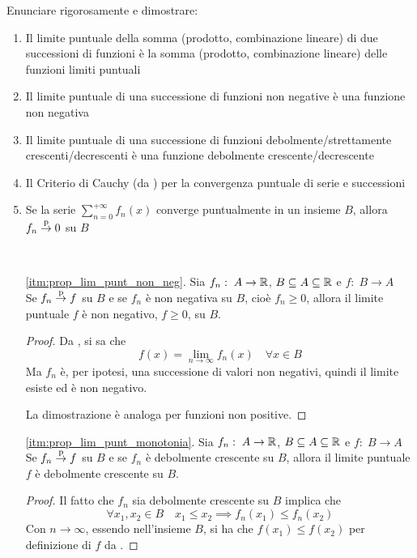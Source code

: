 \begin{exercise}
	\label{ex:dim_prop_lim_conv_punt}
	Enunciare rigorosamente e dimostrare:
	\begin{enumerate}
		\item Il limite puntuale della somma (prodotto, combinazione lineare) di due successioni di funzioni è la somma (prodotto, combinazione lineare) delle funzioni limiti puntuali
		\item \label{itm:prop_lim_punt_non_neg} Il limite puntuale di una successione di funzioni non negative è una funzione non negativa
		\item \label{itm:prop_lim_punt_monotonia} Il limite puntuale di una successione di funzioni debolmente/strettamente crescenti/decrescenti è una funzione debolmente crescente/decrescente
		\item Il Criterio di Cauchy (da ) per la convergenza puntuale di serie e successioni
		\item Se la serie $\sum\limits_{n = 0}^{+\infty} f_n(x)$ converge puntualmente in un insieme $B$, allora $f_n \overset{\text{p}}{\to} 0$ su $B$
	\end{enumerate}
	\begin{solution}~
		\renewcommand\qedsymbol{$\square$} %
		\begin{enumerate}
			\item[\ref{itm:prop_lim_punt_non_neg}.]
				Sia $f_n:\; A \to \mathbb{R}$, $B \subseteq A \subseteq \mathbb{R}$ e $f:\; B \to A$\\
				Se $f_n \overset{\text{p}}{\to} f$ su $B$ e se $f_n$ è non negativa su $B$, cioè $f_n \geq 0$, allora il limite puntuale $f$ è non negativo, $f \geq 0$, su $B$.
				\begin{proof}
					Da , si sa che
					\[f(x) = \lim\limits_{n \to \infty} f_n(x) \quad \forall x \in B\]
					Ma $f_n$ è, per ipotesi, una successione di valori non negativi, quindi il limite esiste ed è non negativo.

					La dimostrazione è analoga per funzioni non positive.
				\end{proof}
			\item[\ref{itm:prop_lim_punt_monotonia}.]
				Sia $f_n:\; A \to \mathbb{R}$, $B \subseteq A \subseteq \mathbb{R}$ e $f:\; B \to A$\\
				Se $f_n \overset{\text{p}}{\to} f$ su $B$ e se $f_n$ è debolmente crescente su $B$, allora il limite puntuale $f$ è debolmente crescente su $B$.
				\begin{proof}
					Il fatto che $f_n$ sia debolmente crescente su $B$ implica che
					\[\forall x_1, x_2 \in B \quad x_1 \leq x_2 \implies f_n(x_1) \leq f_n(x_2)\]
					Con $n \to \infty$, essendo nell'insieme $B$, si ha che $f(x_1) \leq f(x_2)$ per definizione di $f$ da .


\end{proof}
\end{enumerate}
\end{solution}
\end{exercise}
